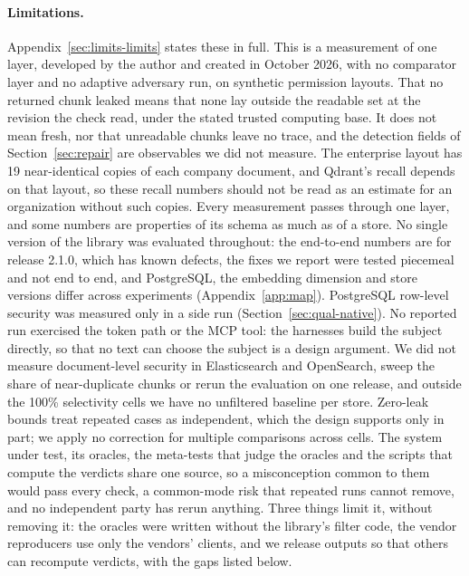 
\paragraph{Limitations.}
Appendix~\ref{sec:limits-limits} states these in full. This is a measurement of one layer, developed by the author and created in October 2026, with no comparator layer and no adaptive adversary run, on synthetic permission layouts. That no returned chunk leaked means that none lay outside the
readable set at the revision the check read, under the stated trusted computing base. It does not mean fresh, nor that
unreadable chunks leave no trace, and the detection fields of Section~\ref{sec:repair} are observables we did not measure.
The enterprise layout has 19 near-identical copies of each company document, and Qdrant's recall depends on that
layout, so these recall numbers should not be read as an estimate for an organization without such copies. Every
measurement passes through one layer, and some numbers are properties of its schema as much as of a store. No single version of the library was
evaluated throughout: the end-to-end numbers are for release 2.1.0, which has known defects, the fixes we report were tested piecemeal and not end to end, and PostgreSQL, the embedding dimension and store versions differ across experiments (Appendix~\ref{app:map}). PostgreSQL row-level security was measured only in a side run (Section~\ref{sec:qual-native}). No reported run exercised the token path or the MCP tool: the harnesses build the subject directly, so that no text can choose the subject is a design argument. We did not measure document-level security in Elasticsearch and OpenSearch, sweep the share of near-duplicate chunks or
rerun the evaluation on one release, and outside the 100\% selectivity cells we have no unfiltered baseline per store. Zero-leak bounds treat repeated cases as independent, which the design supports only in part; we apply no correction for multiple comparisons across cells. The system under test, its oracles, the
meta-tests that judge the oracles and the scripts that compute the verdicts share one source, so a misconception common to them would pass every check, a
common-mode risk that repeated runs cannot remove, and no independent party has rerun anything. Three things limit it, without removing it: the oracles were written without the library's filter code,
the vendor reproducers use only the vendors' clients, and we release outputs so that others can recompute verdicts, with the gaps listed below.

